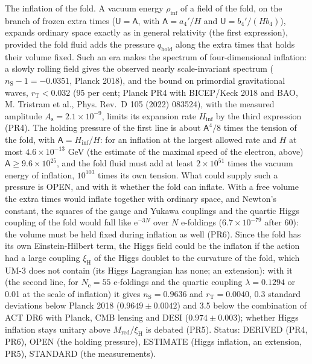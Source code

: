 \documentclass[
  10pt,
]{article}
\begin{document}
The inflation of the fold. A vacuum energy \(\rho_{\mathrm{inf}}\) of a
field of the fold, on the branch of frozen extra times
(\(\mathsf{U} = \mathsf{A}\), with \(\mathsf{A} = a_4'/H\) and
\(\mathsf{U} = b_4'/(Hb_4)\)), expands ordinary space exactly as in
general relativity (the first expression), provided the fold fluid adds
the pressure \(q_{\mathrm{hold}}\) along the extra times that holds
their volume fixed. Such an era makes the spectrum of four-dimensional
inflation: a slowly rolling field gives the observed nearly
scale-invariant spectrum (\(n_{\mathrm{S}} - 1 = -0.0351\), Planck
2018), and the bound on primordial gravitational waves,
\(r_{\mathrm{T}} < 0.032\) (95 per cent; Planck PR4 with BICEP/Keck 2018
and BAO, M. Tristram et al., Phys. Rev.~D 105 (2022) 083524), with the
measured amplitude \(A_{\mathrm{s}} = 2.1\times10^{-9}\), limits its
expansion rate \(H_{\mathrm{inf}}\) by the third expression (PR4). The
holding pressure of the first line is about \(\mathsf{A}^4/8\) times the
tension of the fold, with \(\mathsf{A} = H_{\mathrm{inf}}/H\): for an
inflation at the largest allowed rate and \(H\) at most
\(4.6\times10^{-13}\) GeV (the estimate of the maximal speed of the
electron, above) \(\mathsf{A} \ge 9.6\times10^{25}\), and the fold fluid
must add at least \(2\times10^{51}\) times the vacuum energy of
inflation, \(10^{103}\) times its own tension. What could supply such a
pressure is OPEN, and with it whether the fold can inflate. With a free
volume the extra times would inflate together with ordinary space, and
Newton's constant, the squares of the gauge and Yukawa couplings and the
quartic Higgs coupling of the fold would fall like \(\mathrm{e}^{-3N}\)
over \(N\) e-foldings (\(6.7\times10^{-79}\) after 60): the volume must
be held fixed during inflation as well (PR6). Since the fold has its own
Einstein-Hilbert term, the Higgs field could be the inflaton if the
action had a large coupling \(\xi_{\mathrm{H}}\) of the Higgs doublet to
the curvature of the fold, which UM-3 does not contain (its Higgs
Lagrangian has none; an extension): with it (the second line, for
\(N_{\mathrm{e}} = 55\) e-foldings and the quartic coupling
\(\lambda = 0.1294\) or 0.01 at the scale of inflation) it gives
\(n_{\mathrm{S}} = 0.9636\) and \(r_{\mathrm{T}} = 0.0040\), 0.3
standard deviations below Planck 2018 (\(0.9649 \pm 0.0042\)) and 3.5
below the combination of ACT DR6 with Planck, CMB lensing and DESI
(\(0.974 \pm 0.003\)); whether Higgs inflation stays unitary above
\(M_{\mathrm{red}}/\xi_{\mathrm{H}}\) is debated (PR5). Status: DERIVED
(PR4, PR6), OPEN (the holding pressure), ESTIMATE (Higgs inflation, an
extension, PR5), STANDARD (the measurements).
\end{document}
